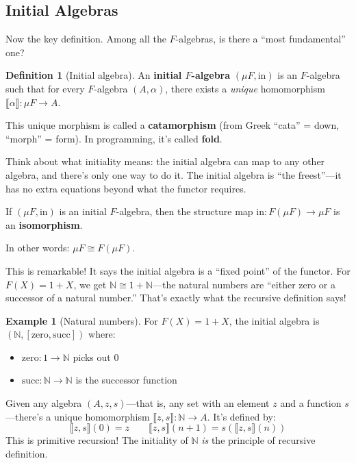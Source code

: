 \documentclass[11pt]{article}
\newcommand{\N}{\mathbb{N}}
\theoremstyle{definition}
\newtheorem{definition}{Definition}[section]
\newtheorem{example}{Example}[section]
\theoremstyle{plain}
\theoremstyle{remark}
\begin{document}
\subsection{Initial Algebras}

Now the key definition. Among all the $F$-algebras, is there a ``most fundamental'' one?

\begin{definition}[Initial algebra]
An \textbf{initial $F$-algebra} $(\mu F, \text{in})$ is an $F$-algebra such that for every $F$-algebra $(A, \alpha)$, there exists a \emph{unique} homomorphism $\llbracket \alpha \rrbracket: \mu F \to A$.

This unique morphism is called a \textbf{catamorphism} (from Greek ``cata'' = down, ``morph'' = form). In programming, it's called \textbf{fold}.
\end{definition}

Think about what initiality means: the initial algebra can map to any other algebra, and there's only one way to do it. The initial algebra is ``the freest''---it has no extra equations beyond what the functor requires.

\begin{keyresult}
If $(\mu F, \text{in})$ is an initial $F$-algebra, then the structure map $\text{in}: F(\mu F) \to \mu F$ is an \textbf{isomorphism}.

In other words: $\mu F \cong F(\mu F)$.
\end{keyresult}

This is remarkable! It says the initial algebra is a ``fixed point'' of the functor. For $F(X) = 1 + X$, we get $\N \cong 1 + \N$---the natural numbers are ``either zero or a successor of a natural number.'' That's exactly what the recursive definition says!

\begin{example}[Natural numbers]
For $F(X) = 1 + X$, the initial algebra is $(\N, [\text{zero}, \text{succ}])$ where:
\begin{itemize}
  \item $\text{zero}: 1 \to \N$ picks out $0$
  \item $\text{succ}: \N \to \N$ is the successor function
\end{itemize}

Given any algebra $(A, z, s)$---that is, any set with an element $z$ and a function $s$---there's a unique homomorphism $\llbracket z, s \rrbracket: \N \to A$. It's defined by:
\[
\llbracket z, s \rrbracket(0) = z \qquad \llbracket z, s \rrbracket(n+1) = s(\llbracket z, s \rrbracket(n))
\]
This is primitive recursion! The initiality of $\N$ \emph{is} the principle of recursive definition.
\end{example}
\end{document}

